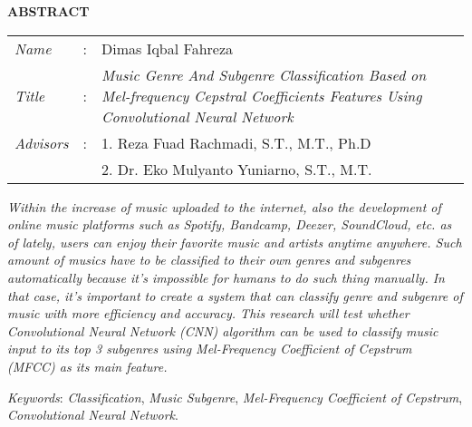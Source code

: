 \begin{center}
  \large\textbf{ABSTRACT}
\end{center}


\vspace{2ex}

\begingroup
  \setlength{\tabcolsep}{0pt}

  \noindent
  \begin{tabularx}{\textwidth}{l >{\centering}m{3em} X}
    \emph{Name}     &:& Dimas Iqbal Fahreza \\

    \emph{Title}    &:& \emph{Music Genre And Subgenre Classification Based on Mel-frequency Cepstral Coefficients Features Using Convolutional Neural Network} \\

    \emph{Advisors} &:& 1. Reza Fuad Rachmadi, S.T., M.T., Ph.D \\
                    & & 2. Dr. Eko Mulyanto Yuniarno, S.T., M.T. \\
  \end{tabularx}
\endgroup

\emph{Within the increase of music uploaded to the internet, also the development of online music platforms such as Spotify, Bandcamp, Deezer, SoundCloud, etc. as of lately, users can enjoy their favorite music and artists anytime anywhere. Such amount of musics have to be classified to their own genres and subgenres automatically because it's impossible for humans to do such thing manually. In that case, it's important to create a system that can classify genre and subgenre of music with more efficiency and accuracy. This research will test whether Convolutional Neural Network (CNN) algorithm can be used to classify music input to its top 3 subgenres using Mel-Frequency Coefficient of Cepstrum (MFCC) as its main feature.}

\emph{Keywords}:
\emph{Classification}, \emph{Music Subgenre}, \emph{Mel-Frequency Coefficient of Cepstrum}, \emph{Convolutional Neural Network}.
